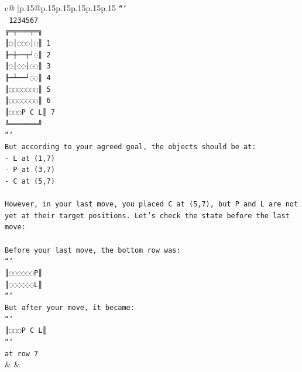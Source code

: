 \documentclass{article}
\begin{document}
{\begin{supertabular}{c@{$\;$}|p{.15\linewidth}@{}p{.15\linewidth}p{.15\linewidth}p{.15\linewidth}p{.15\linewidth}p{.15\linewidth}}
{{{\texttt{```} \\
\texttt{ 1234567} \\
\texttt{╔═╤═══╤═╗} \\
\texttt{║◌│◌◌◌│◌║ 1} \\
\texttt{╟─┼──┬┘◌║ 2} \\
\texttt{║◌│◌◌│◌◌║ 3} \\
\texttt{╟─┴──┘◌◌║ 4} \\
\texttt{║◌◌◌◌◌◌◌║ 5} \\
\texttt{║◌◌◌◌◌◌◌║ 6} \\
\texttt{║◌◌◌P C L║ 7} \\
\texttt{╚═══════╝} \\
\texttt{```} \\
\texttt{But according to your agreed goal, the objects should be at:} \\
\texttt{{-} L at (1,7)} \\
\texttt{{-} P at (3,7)} \\
\texttt{{-} C at (5,7)} \\
\\ 
\texttt{However, in your last move, you placed C at (5,7), but P and L are not yet at their target positions. Let's check the state before the last move:} \\
\\ 
\texttt{Before your last move, the bottom row was:} \\
\texttt{```} \\
\texttt{║◌◌◌◌◌◌P║} \\
\texttt{║◌◌◌◌◌◌L║} \\
\texttt{```} \\
\texttt{But after your move, it became:} \\
\texttt{```} \\
\texttt{║◌◌◌P C L║} \\
\texttt{```} \\
\texttt{at row 7} \\
            }
        }
    }
    & & \\ \\


\end{supertabular}}
\end{document}
